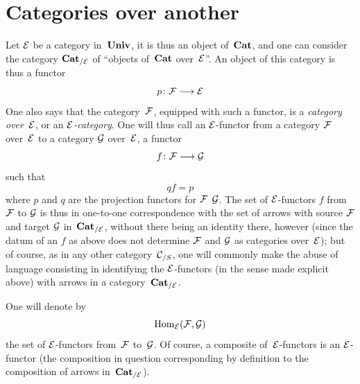 \section{Categories over another}
\label{VI.2}

Let $\cal{E}$ be a category in~$\Univ$, it is thus an object
of~$\Cat$, and one can consider the category
$\Cat_{/\cal{E}}$
of ``objects of~$\Cat$ over~$\cal{E}$''. An object of this
category is thus a functor
$$
p\colon \cal{F}\to\cal{E}
$$
One also says that the category~$\cal{F}$, equipped with such a functor,
is a \emph{category over}~$\cal{E}$, or an
$\cal{E}$\emph{-category}. One will thus call an $\cal{E}$-functor
from a category $\cal{F}$ over~$\cal{E}$ to a category
$\cal{G}$ over~$\cal{E}$, a functor
$$
f\colon\cal{F}\to\cal{G}
$$
such that
$$
qf=p
$$
where $p$ and $q$ are the projection functors for $\cal{F}$
\resp $\cal{G}$. The set of $\cal{E}$-functors $f$ from~$\cal{F}$
to $\cal{G}$ is thus in one-to-one correspondence with the set
of arrows with source $\cal{F}$ and target $\cal{G}$
in~$\Cat_{/\cal{E}}$, without
there being an identity there, however (since the datum of an
$f$ as above does not determine $\cal{F}$ and $\cal{G}$ as
categories over~$\cal{E}$); but of course, as in any
other category~$\cal{C}_{/S}$, one will commonly make the abuse of
language consisting in identifying the $\cal{E}$-functors (in the
sense made explicit above) with arrows in a
category~$\Cat_{/\cal{E}}$.

One will denote by
$$
\Hom_{\cal{E}}(\cal{F},\cal{G})
$$
the set of $\cal{E}$-functors from~$\cal{F}$ to~$\cal{G}$. Of
course, a composite of~$\cal{E}$-functors is an
$\cal{E}$-functor (the composition in question corresponding by
definition to the composition of arrows
in~$\Cat_{/\cal{E}}$).

